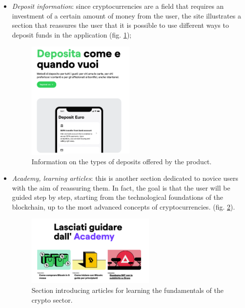 \begin{itemize}
  \item \textit{Deposit information}: since cryptocurrencies are a field 
  that requires an investment of a certain amount of money from the user, 
  the site illustrates a section that reassures the user that it is 
  possible to use different ways to deposit funds in the application 
  (fig. \ref{fig:deposit-options});
  \begin{figure}[H]
    \centering
    \includegraphics[width=0.50\textwidth]{res/images/deposit-options.png}
    \caption{Information on the types of deposits offered by the product.}
    \label{fig:deposit-options}
  \end{figure}

  \item \textit{Academy, learning articles}: this is another section 
  dedicated to novice users with the aim of reassuring them. In fact, the 
  goal is that the user will be guided step by step, starting from the 
  technological foundations of the blockchain, up to the most advanced 
  concepts of cryptocurrencies. (fig. \ref{fig:academy}).
  \begin{figure}[H]
    \centering
    \includegraphics[width=0.60\textwidth]{res/images/academy.png}
    \caption{Section introducing articles for learning the fundamentals 
    of the crypto sector.}
    \label{fig:academy}
  \end{figure}
\end{itemize}

